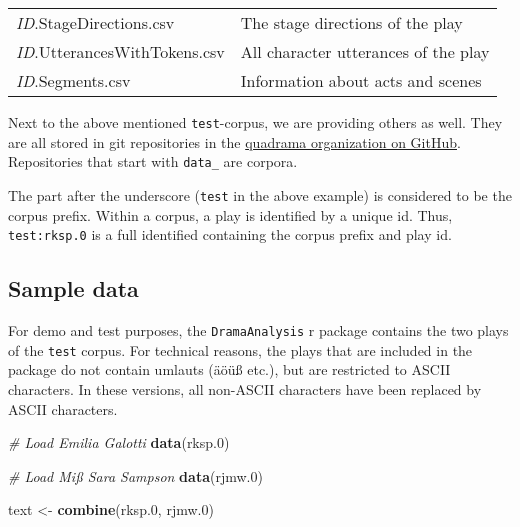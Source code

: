 \documentclass[]{book}
\newenvironment{Shaded}{\begin{snugshade}}{\end{snugshade}}
\newcommand{\CommentTok}[1]{\textcolor[rgb]{0.56,0.35,0.01}{\textit{#1}}}
\newcommand{\FloatTok}[1]{\textcolor[rgb]{0.00,0.00,0.81}{#1}}
\newcommand{\KeywordTok}[1]{\textcolor[rgb]{0.13,0.29,0.53}{\textbf{#1}}}
\newcommand{\NormalTok}[1]{#1}
\newcommand{\StringTok}[1]{\textcolor[rgb]{0.31,0.60,0.02}{#1}}
\begin{document}
\begin{longtable}[]{@{}ll@{}}
\begin{minipage}[t]{0.26\columnwidth}
\emph{ID}.StageDirections.csv\strut
\end{minipage} & \begin{minipage}[t]{0.68\columnwidth}\raggedright
The stage directions of the play\strut
\end{minipage}\tabularnewline
\begin{minipage}[t]{0.26\columnwidth}\raggedright
\emph{ID}.UtterancesWithTokens.csv\strut
\end{minipage} & \begin{minipage}[t]{0.68\columnwidth}\raggedright
All character utterances of the play\strut
\end{minipage}\tabularnewline
\begin{minipage}[t]{0.26\columnwidth}\raggedright
\emph{ID}.Segments.csv\strut
\end{minipage} & \begin{minipage}[t]{0.68\columnwidth}\raggedright
Information about acts and scenes\strut
\end{minipage}\tabularnewline
\bottomrule
\end{longtable}

Next to the above mentioned \texttt{test}-corpus, we are providing others as well. They are all stored in git repositories in the \href{https://github.com/quadrama}{quadrama organization on GitHub}. Repositories that start with \texttt{data\_} are corpora.

The part after the underscore (\texttt{test} in the above example) is considered to be the corpus prefix. Within a corpus, a play is identified by a unique id. Thus, \texttt{test:rksp.0} is a full identified containing the corpus prefix and play id.

\hypertarget{sample-data}{%
\subsection{Sample data}\label{sample-data}}

For demo and test purposes, the \texttt{DramaAnalysis} r package contains the two plays of the \texttt{test} corpus. For technical reasons, the plays that are included in the package do not contain umlauts (äöüß etc.), but are restricted to ASCII characters. In these versions, all non-ASCII characters have been replaced by ASCII characters.

\begin{Shaded}
\begin{Highlighting}[]
\CommentTok{# Load Emilia Galotti}
\KeywordTok{data}\NormalTok{(rksp}\FloatTok{.0}\NormalTok{)}

\CommentTok{# Load Miß Sara Sampson}
\KeywordTok{data}\NormalTok{(rjmw}\FloatTok{.0}\NormalTok{)}

\NormalTok{text <-}\StringTok{ }\KeywordTok{combine}\NormalTok{(rksp}\FloatTok{.0}\NormalTok{, rjmw}\FloatTok{.0}\NormalTok{)}
\end{Highlighting}
\end{Shaded}
\end{document}
